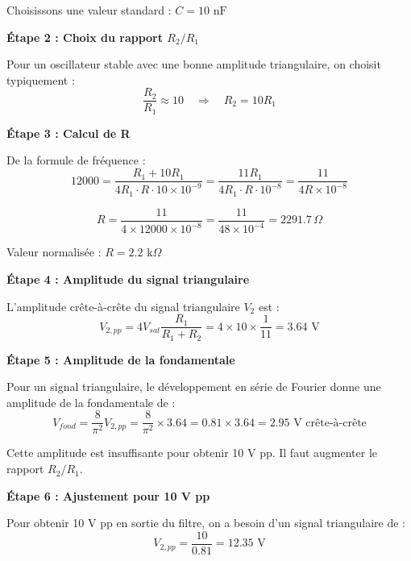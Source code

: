 \documentclass[11pt,a4paper]{article}
\begin{document}
Choisissons une valeur standard : $\boxed{C = 10 \text{ nF}}$

\textbf{Étape 2 : Choix du rapport $R_2/R_1$}

Pour un oscillateur stable avec une bonne amplitude triangulaire, on choisit typiquement :
\begin{equation}
\frac{R_2}{R_1} \approx 10 \quad \Rightarrow \quad R_2 = 10 R_1
\end{equation}

\textbf{Étape 3 : Calcul de R}

De la formule de fréquence :
\begin{equation}
12000 = \frac{R_1 + 10R_1}{4 R_1 \cdot R \cdot 10 \times 10^{-9}} = \frac{11R_1}{4 R_1 \cdot R \cdot 10^{-8}} = \frac{11}{4R \times 10^{-8}}
\end{equation}

\begin{equation}
R = \frac{11}{4 \times 12000 \times 10^{-8}} = \frac{11}{48 \times 10^{-4}} = 2291.7 \, \Omega
\end{equation}

Valeur normalisée : $\boxed{R = 2.2 \text{ k}\Omega}$

\textbf{Étape 4 : Amplitude du signal triangulaire}

L'amplitude crête-à-crête du signal triangulaire $V_2$ est :
\begin{equation}
V_{2,pp} = 4 V_{sat} \frac{R_1}{R_1 + R_2} = 4 \times 10 \times \frac{1}{11} = 3.64 \text{ V}
\end{equation}

\textbf{Étape 5 : Amplitude de la fondamentale}

Pour un signal triangulaire, le développement en série de Fourier donne une amplitude de la fondamentale de :
\begin{equation}
V_{fond} = \frac{8}{\pi^2} V_{2,pp} = \frac{8}{\pi^2} \times 3.64 = 0.81 \times 3.64 = 2.95 \text{ V crête-à-crête}
\end{equation}

Cette amplitude est insuffisante pour obtenir 10 V pp. Il faut augmenter le rapport $R_2/R_1$.

\textbf{Étape 6 : Ajustement pour 10 V pp}

Pour obtenir 10 V pp en sortie du filtre, on a besoin d'un signal triangulaire de :
\begin{equation}
V_{2,pp} = \frac{10}{0.81} = 12.35 \text{ V}
\end{equation}
\end{document}
